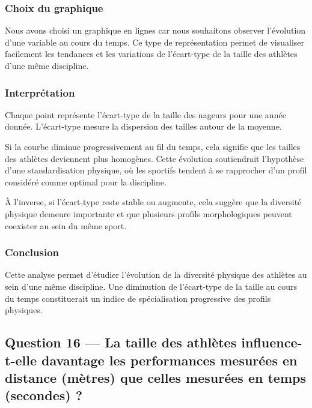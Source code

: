 \documentclass[
]{article}
\begin{document}
\subsubsection{Choix du graphique}\label{choix-du-graphique-4}

Nous avons choisi un graphique en lignes car nous souhaitons observer
l'évolution d'une variable au cours du temps. Ce type de représentation
permet de visualiser facilement les tendances et les variations de
l'écart-type de la taille des athlètes d'une même discipline.

\subsubsection{Interprétation}\label{interpruxe9tation-15}

Chaque point représente l'écart-type de la taille des nageurs pour une
année donnée. L'écart-type mesure la dispersion des tailles autour de la
moyenne.

Si la courbe diminue progressivement au fil du temps, cela signifie que
les tailles des athlètes deviennent plus homogènes. Cette évolution
soutiendrait l'hypothèse d'une standardisation physique, où les sportifs
tendent à se rapprocher d'un profil considéré comme optimal pour la
discipline.

À l'inverse, si l'écart-type reste stable ou augmente, cela suggère que
la diversité physique demeure importante et que plusieurs profils
morphologiques peuvent coexister au sein du même sport.

\subsubsection{Conclusion}\label{conclusion-1}

Cette analyse permet d'étudier l'évolution de la diversité physique des
athlètes au sein d'une même discipline. Une diminution de l'écart-type
de la taille au cours du temps constituerait un indice de spécialisation
progressive des profils physiques.

\subsection{Question 16 --- La taille des athlètes influence-t-elle
davantage les performances mesurées en distance (mètres) que celles
mesurées en temps (secondes)
?}\label{question-16-la-taille-des-athluxe8tes-influence-t-elle-davantage-les-performances-mesuruxe9es-en-distance-muxe8tres-que-celles-mesuruxe9es-en-temps-secondes}
\end{document}
